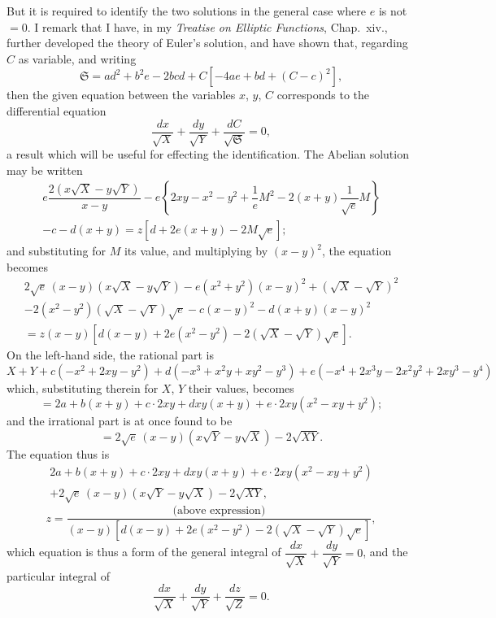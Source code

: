\documentclass[11pt]{article}
\begin{document}
But it is required to identify the two solutions in the general case where $e$ is not $= 0$. I remark that I have, in my \textit{Treatise on Elliptic Functions}, Chap.~xiv., further developed the theory of Euler's solution, and have shown that, regarding $C$ as variable, and writing
\[
\mathfrak{S} = ad^2 + b^2 e - 2bcd + C[-4ae + bd + (C - c)^2],
\]
then the given equation between the variables $x$, $y$, $C$ corresponds to the differential equation
\[
\dfrac{dx}{\sqrt{X}} + \dfrac{dy}{\sqrt{Y}} + \dfrac{dC}{\sqrt{\mathfrak{S}}} = 0,
\]
a result which will be useful for effecting the identification. The Abelian solution may be written
\begin{multline*}
e\dfrac{2(x\sqrt{X} - y\sqrt{Y})}{x - y} - e\!\left\{2xy - x^2 - y^2 + \dfrac{1}{e}M^2 - 2(x + y)\dfrac{1}{\sqrt{e}}M\right\}\\
- c - d(x + y) = z\!\left[d + 2e(x + y) - 2M\sqrt{e}\right];
\end{multline*}
and substituting for $M$ its value, and multiplying by $(x - y)^2$, the equation becomes
\begin{multline*}
2\sqrt{e}\,(x - y)(x\sqrt{X} - y\sqrt{Y}) - e(x^2 + y^2)(x - y)^2 + (\sqrt{X} - \sqrt{Y})^2\\
- 2(x^2 - y^2)(\sqrt{X} - \sqrt{Y})\sqrt{e} - c(x - y)^2 - d(x + y)(x - y)^2\\
= z(x - y)\!\left[d(x - y) + 2e(x^2 - y^2) - 2(\sqrt{X} - \sqrt{Y})\sqrt{e}\right].
\end{multline*}
On the left-hand side, the rational part is
\[
X + Y + c(-x^2 + 2xy - y^2) + d(-x^3 + x^2 y + xy^2 - y^3) + e(-x^4 + 2x^3 y - 2x^2 y^2 + 2xy^3 - y^4)
\]
which, substituting therein for $X$, $Y$ their values, becomes
\[
= 2a + b(x + y) + c\cdot 2xy + dxy(x + y) + e\cdot 2xy(x^2 - xy + y^2);
\]
and the irrational part is at once found to be
\[
= 2\sqrt{e}\,(x - y)(x\sqrt{Y} - y\sqrt{X}) - 2\sqrt{XY}.
\]
The equation thus is
\begin{multline*}
2a + b(x + y) + c\cdot 2xy + dxy(x + y) + e\cdot 2xy(x^2 - xy + y^2)\\
+ 2\sqrt{e}\,(x - y)(x\sqrt{Y} - y\sqrt{X}) - 2\sqrt{XY},
\end{multline*}
\[
z = \dfrac{\text{(above expression)}}{(x - y)\!\left[d(x - y) + 2e(x^2 - y^2) - 2(\sqrt{X} - \sqrt{Y})\sqrt{e}\right]},
\]
which equation is thus a form of the general integral of $\dfrac{dx}{\sqrt{X}} + \dfrac{dy}{\sqrt{Y}} = 0$, and the particular integral of
\[
\dfrac{dx}{\sqrt{X}} + \dfrac{dy}{\sqrt{Y}} + \dfrac{dz}{\sqrt{Z}} = 0.
\]
\end{document}
